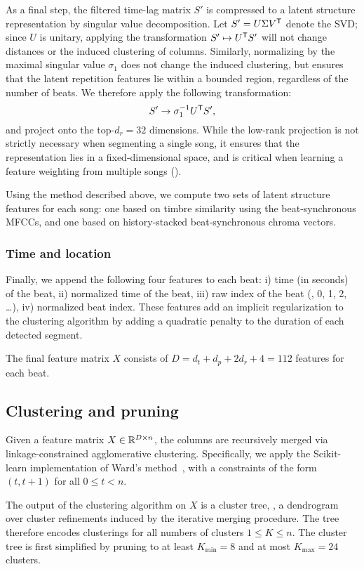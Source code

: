 \documentclass{article}
\begin{document}
As a final step, the filtered time-lag matrix $S'$ is compressed to a latent structure representation by singular
value decomposition.  
Let $S' = U\Sigma V^\mathsf{T}$ denote the SVD; since $U$ is unitary, applying the transformation $S' \mapsto U^\mathsf{T} S'$ 
will not change distances or the induced clustering of columns.  Similarly, normalizing by the maximal 
singular value $\sigma_1$ does not change the induced clustering, but ensures that the latent repetition features
lie within a bounded region, regardless of the number of beats.  We therefore apply the following
transformation:
\[
S' \rightarrow \sigma_1^{-1} U^\mathsf{T} S',
\]
and project onto the top-$d_r = 32$ dimensions.  While the low-rank projection is not strictly necessary when
segmenting a single song, it ensures that the representation lies in a fixed-dimensional space, and is critical
when learning a feature weighting from multiple songs ().

Using the method described above, we compute two sets of latent structure features for each song: one based on
timbre similarity using the beat-synchronous MFCCs, and one based on history-stacked beat-synchronous chroma
vectors.

\subsubsection{Time and location}
Finally, we append the following four features to each beat: i) time (in seconds) of the beat, ii) normalized
time of the beat, iii) raw index of the beat (\eg, 0, 1, 2, \dots), iv) normalized beat index.  These features
add an implicit regularization to the clustering algorithm by adding a quadratic penalty to the duration of each
detected segment.


The final feature matrix $X$ consists of $D = d_t + d_p + 2d_r + 4 = 112$ features for each beat.

\subsection{Clustering and pruning}

Given a feature matrix $X \in \mathbb{R}^{D \times n}$, the columns are recursively merged via linkage-constrained
agglomerative clustering.  Specifically, we apply the Scikit-learn implementation of Ward's
method~\cite{pedregosa2011scikit, ward1963hierarchical}, with a constraints of the form $(t, t+1)$ for all $0
\leq t < n$.

The output of the clustering algorithm on $X$ is a cluster tree, \ie, a dendrogram over cluster refinements
induced by the iterative merging procedure.  The tree therefore encodes clusterings for all numbers of clusters 
$1 \leq K \leq n$.  The cluster tree is first simplified by pruning to at least $K_{\min}=8$ and at most 
$K_{\max} = 24$ clusters.
\end{document}
